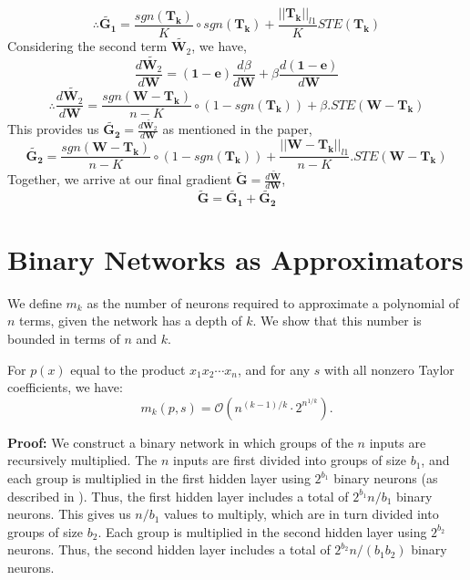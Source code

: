 \begin{dmath}
\therefore \widetilde{\mathbf{G_1}} = \frac{sgn(\mathbf{T_k})}{K} \circ sgn(\mathbf{T_k}) + \frac{||\mathbf{T_k}||_{l1}}{K}STE(\mathbf{T_k})
\end{dmath}
Considering the second term $\widetilde{\mathbf{W}_2}$, we have,
$$\frac{d\widetilde{\mathbf{W}_{2}}}{d\mathbf{W}} = \mathbf{(1-e)} \frac{d\beta}{d\mathbf{W}} + \beta \frac{d\mathbf{(1-e)}}{d\mathbf{W}}$$
$$\therefore \frac{d\widetilde{\mathbf{W}_{2}}}{d\mathbf{W}} = \frac{sgn(\mathbf{W}-\mathbf{T_k})}{n-K} \circ (1-sgn(\mathbf{T_k})) + \beta.STE(\mathbf{W}-\mathbf{T_k})$$
This provides us $\widetilde{\mathbf{G_2}} = \frac{d\widetilde{\mathbf{W}_{2}}}{d\mathbf{W}}$ as mentioned in the paper,
\begin{dmath}
\widetilde{\mathbf{G_2}} = \frac{sgn(\mathbf{W}-\mathbf{T_k})}{n-K} \circ (1-sgn(\mathbf{T_k})) + \frac{||\mathbf{W}-\mathbf{T_k}||_{l1}}{n-K}.STE(\mathbf{W}-\mathbf{T_k})
\end{dmath}
Together, we arrive at our final gradient $\widetilde{\mathbf{G}} = \frac{d\widetilde{\mathbf{W}}}{d\mathbf{W}}$,
\begin{dmath}
\widetilde{\mathbf{G}} = \widetilde{\mathbf{G_1}} + \widetilde{\mathbf{G_2}}
\end{dmath}

\section{Binary Networks as Approximators}
\noindent We define $m_{k}$ as the number of neurons required to approximate a polynomial of $n$ terms, given the network has a depth of $k$. We show that this number is bounded in terms of $n$ and $k$.
\begin{theorem}
For $p(x)$ equal to the product $x_1x_2\cdots x_n$, and for any $s$ with all nonzero Taylor coefficients, we have:
\begin{equation}
m_k(p, s) = \mathcal{O}\left(n^{(k-1)/k}\cdot 2^{n^{1/k}}\right).\label{eqn:constantlayers}
\end{equation}
\label{thm:constantlayers}
\end{theorem}
{\bf Proof:} We construct a binary network in which groups of the $n$ inputs are recursively multiplied.  The $n$ inputs are first divided into groups of size $b_1$, and each group is multiplied in the first hidden layer using $2^{b_1}$ binary neurons (as described in \cite{lin2017does}).  Thus, the first hidden layer includes a total of $2^{b_1}n/b_1$ binary neurons. This gives us $n/b_1$ values to multiply, which are in turn divided into groups of size $b_2$.  Each group is multiplied in the second hidden layer using $2^{b_2}$ neurons.  Thus, the second hidden layer includes a total of $2^{b_2}n/(b_1b_2)$ binary neurons.

